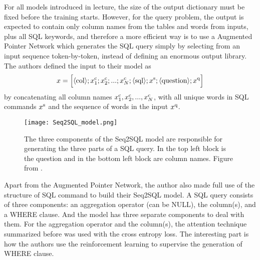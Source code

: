 For all models introduced in lecture, the size of the output dictionary must be
fixed before the training starts. However, for the query problem, the output is
expected to contain only column names from the tables and words from inputs, plus
all SQL keywords, and therefore a more efficient way is to use a Augmented
Pointer Network which generates the SQL query simply by selecting from an input
sequence token-by-token, instead of defining an enormous output library. The authors
defined the input to their model as
\begin{align*}
	x = \Big[\langle {\rm col} \rangle; x_1^{\rm c};x_2^{\rm c};...;x_N^{\rm c};\langle {\rm sql} \rangle; x^{\rm s}; \langle {\rm question} \rangle; x^{\rm q} \Big]
\end{align*}
by concatenating all column names $x_1^{\rm c}, x_2^{\rm c},...,x_N^{\rm c}$,
with all unique words in SQL commands $x^{\rm s}$ and the sequence of words in
the input $x^{\rm q}$.


\begin{figure}[ht!]
	\centering
	\texttt{[image: Seq2SQL\_model.png]}
	\caption{The three components of the Seq2SQL model are responsible for
		generating the three parts of a SQL query. In the top left block is the
		question and in the bottom left block are column names. Figure from
		\cite{zhong2017seq2sql}.}
	\label{app1}
\end{figure}

Apart from the Augmented Pointer Network, the author also made full use of the
structure of SQL command to build their Seq2SQL model. A SQL query consists of
three components: an aggregation operator (can be NULL), the column(s), and a
WHERE clause. And the model has three separate components to deal with them.
For the aggregation operator and the column(s), the attention technique
summarized before was used with the cross entropy loss. The interesting part is
how the authors use the reinforcement learning to supervise the generation of
WHERE clause.

